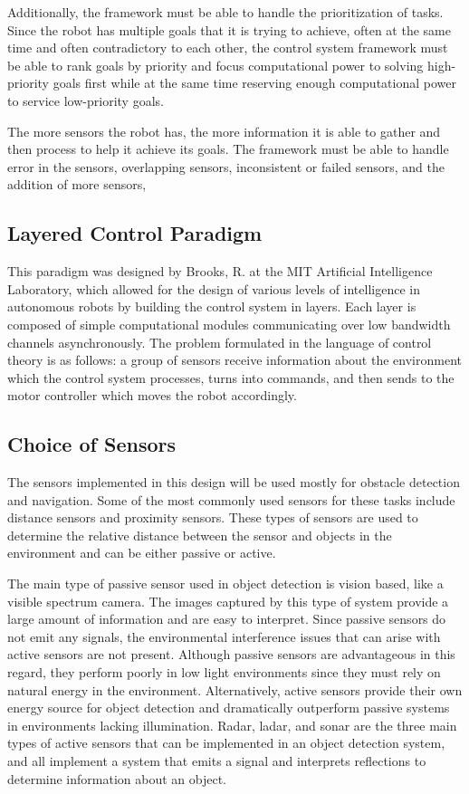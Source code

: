 Additionally, the framework must be able to handle the prioritization of tasks. Since the robot has multiple goals that it is trying to achieve, often at the same time and often contradictory to each other, the control system framework must be able to rank goals by priority and focus computational power to solving high-priority goals first while at the same time reserving enough computational power to service low-priority goals.

The more sensors the robot has, the more information it is able to gather and then process to help it achieve its goals. The framework must be able to handle error in the sensors, overlapping sensors, inconsistent or failed sensors, and the addition of more sensors, 

\subsection*{Layered Control Paradigm \cite{Brooks:1985}}
This paradigm was designed by Brooks, R. at the MIT Artificial Intelligence Laboratory, which allowed for the design of various levels of intelligence in autonomous robots by building the control system in layers. Each layer is composed of simple computational modules communicating over low bandwidth channels asynchronously. The problem formulated in the language of control theory is as follows: a group of sensors receive information about the environment which the control system processes, turns into commands, and then sends to the motor controller which moves the robot accordingly.

\subsection*{Choice of Sensors}
The sensors implemented in this design will be used mostly for obstacle detection and navigation.  Some of the most commonly used sensors for these tasks include distance sensors and proximity sensors.  These types of sensors are used to determine the relative distance between the sensor and objects in the environment and can be either passive or active. 

The main type of passive sensor used in object detection is vision based, like a visible spectrum camera.  The images captured by this type of system provide a large amount of information and are easy to interpret. Since passive sensors do not emit any signals, the environmental interference issues that can arise with active sensors are not present.  Although passive sensors are advantageous in this regard, they perform poorly in low light environments since they must rely on natural energy in the environment.  Alternatively, active sensors provide their own energy source for object detection and dramatically outperform passive systems in environments lacking illumination.  Radar, ladar, and sonar are the three main types of active sensors that can be implemented in an object detection system, and all implement a system that emits a signal and interprets reflections to determine information about an object.  \cite{Discant}

